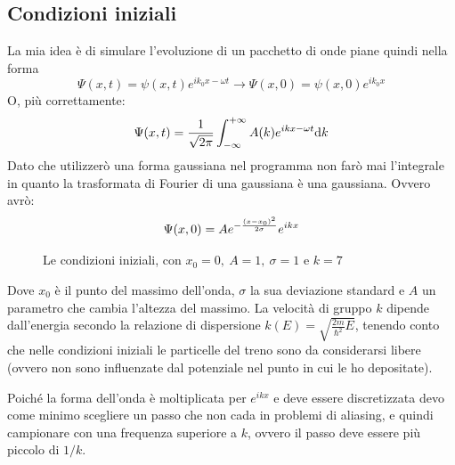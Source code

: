 \subsection{Condizioni iniziali}
La mia idea \`e di simulare l'evoluzione di un pacchetto di onde piane quindi nella forma
\begin{equation}
\Psi(x,t) = \psi(x,t)e^{ik_0x-\omega t} \to \Psi(x,0) = \psi(x,0)e^{ik_0x}
\end{equation}
O, pi\`u correttamente:
\begin{equation}
\Psi(x,t) = \frac{1}{\sqrt{2\pi}}\int_{-\infty}^{+\infty} A(k) e^{ikx-\omega t}\mathrm{d} k
\end{equation}
Dato che utilizzer\`o una forma gaussiana nel programma non far\`o mai l'integrale in quanto la trasformata di Fourier di una gaussiana \`e una gaussiana.
Ovvero avr\`o:
\begin{equation}
\Psi(x,0) = Ae^{-\frac{\left( x-x_0 \right)^2}{2\sigma}}e^{ikx}
\end{equation}
\begin{figure}[hbt]
	\centering
	\caption{Le condizioni iniziali, con $x_0=0,\ A=1,\ \sigma = 1$ e $k=7$}
\end{figure}
Dove $x_0$ \`e il punto del massimo dell'onda, $\sigma$ la sua deviazione standard e $A$ un parametro che cambia l'altezza del massimo.
La velocit\`a di gruppo $k$ dipende dall'energia secondo la relazione di dispersione $k(E) = \sqrt{\frac{2m}{\hbar^2}E}$, tenendo conto che nelle condizioni iniziali le particelle del treno sono da considerarsi libere (ovvero non sono influenzate dal potenziale nel punto in cui le ho depositate).

Poich\'e la forma dell'onda \`e moltiplicata per $e^{ikx}$ e deve essere discretizzata devo come minimo scegliere un passo che non cada in problemi di aliasing, e quindi campionare con una frequenza superiore a $k$, ovvero il passo deve essere pi\`u piccolo di $1/k$.

